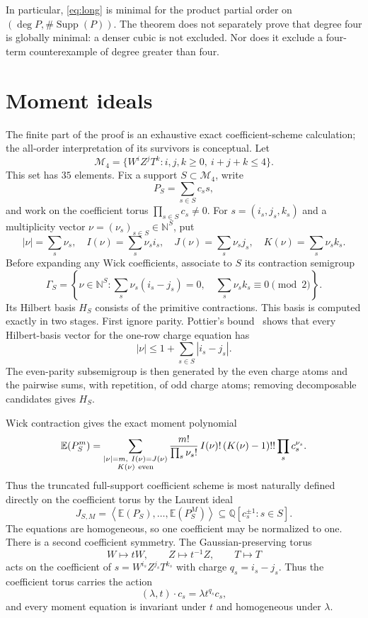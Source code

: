 \documentclass[11pt]{article}
\newcommand{\E}{\mathbb E}
\newcommand{\Supp}{\operatorname{Supp}}
\begin{document}
In particular, \eqref{eq:long} is minimal for the product partial order on
\((\deg P,\#\Supp(P))\).  The theorem does not separately prove that degree
four is globally minimal: a denser cubic is not excluded.  Nor does it
exclude a four-term counterexample of degree greater than four.

\section{Moment ideals}

The finite part of the proof is an exhaustive exact coefficient-scheme
calculation; the all-order interpretation of its survivors is conceptual.
Let
\[
 \mathcal M_4
 =\{W^iZ^jT^k:i,j,k\geq0,\ i+j+k\leq4\}.
\]
This set has \(35\) elements.  Fix a support \(S\subset\mathcal M_4\), write
\[
 P_S=\sum_{s\in S}c_ss,
\]
and work on the coefficient torus \(\prod_{s\in S}c_s\neq0\).  For
\(s=(i_s,j_s,k_s)\) and a multiplicity vector
\(\nu=(\nu_s)_{s\in S}\in\mathbb N^S\), put
\[
 |\nu|=\sum_s\nu_s,\quad
 I(\nu)=\sum_s\nu_si_s,\quad
 J(\nu)=\sum_s\nu_sj_s,\quad
K(\nu)=\sum_s\nu_sk_s.
\]
Before expanding any Wick coefficients, associate to \(S\) its contraction
semigroup
\[
 \Gamma_S=
 \left\{\nu\in\mathbb N^S:
   \sum_s\nu_s(i_s-j_s)=0,\quad
   \sum_s\nu_sk_s\equiv0\pmod2
 \right\}.
\]
Its Hilbert basis \(H_S\) consists of the primitive contractions.  This
basis is computed exactly in two stages.  First ignore parity.  Pottier's
bound~\cite{Pottier} shows that every Hilbert-basis vector for the one-row
charge equation has
\[
  |\nu|\leq1+\sum_{s\in S}|i_s-j_s|.
\]
The even-parity subsemigroup is then generated by the even charge atoms and
the pairwise sums, with repetition, of odd charge atoms; removing
decomposable candidates gives \(H_S\).

Wick contraction gives the exact moment polynomial
\begin{equation}\label{eq:sparse-moment}
 \E(P_S^m)
 =
 \sum_{\substack{|\nu|=m,\ I(\nu)=J(\nu)\\K(\nu)\ {\rm even}}}
 \frac{m!}{\prod_s\nu_s!}\,
 I(\nu)!\,(K(\nu)-1)!!\prod_sc_s^{\nu_s}.
\end{equation}
Thus the truncated full-support coefficient scheme is most naturally
defined directly on the coefficient torus by the Laurent ideal
\begin{equation}\label{eq:laurent-ideal}
 J_{S,M}
 =
 \left\langle\E(P_S),\ldots,\E(P_S^M)\right\rangle
 \subseteq \mathbb Q[c_s^{\pm1}:s\in S].
\end{equation}
The equations are homogeneous, so one coefficient may be normalized to
one.  There is a second coefficient symmetry.  The
Gaussian-preserving torus
\[
  W\longmapsto tW,\qquad Z\longmapsto t^{-1}Z,\qquad T\longmapsto T
\]
acts on the coefficient of \(s=W^{i_s}Z^{j_s}T^{k_s}\) with charge
\(q_s=i_s-j_s\).  Thus the coefficient torus carries the action
\[
  (\lambda,t)\cdot c_s=\lambda t^{q_s}c_s,
\]
and every moment equation is invariant under \(t\) and homogeneous under
\(\lambda\).
\end{document}

